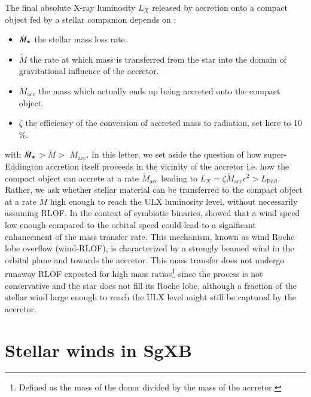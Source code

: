 \documentclass[letter]{aa}
\makeatletter
\newcommand{\ulx}{ULX\xspace}
\newcommand*{\rlof}{RLOF\@\xspace}
\newcommand*{\ie}{i.e.\@\xspace}
\newcommand{\mystar}{{\fontfamily{lmr}\selectfont$\star$}}
\newcommand*{\mdotstar}{$\dot{M}_{\text{\mystar}}$\@\xspace}
\newcommand*{\mdotacc}{$\dot{M}_{\text{acc}}$\@\xspace}
\newcommand*{\ledd}{$L_{\text{Edd}}$\@\xspace}
\makeatother
\begin{document}
The final absolute X-ray luminosity $L_X$ released by accretion onto a compact object fed by a stellar companion depends on :
\begin{itemize}
\item \mdotstar the stellar mass loss rate.
\item $\dot{M}$ the rate at which mass is transferred from the star into the domain of gravitational influence of the accretor.
\item \mdotacc the mass which actually ends up being accreted onto the compact object.
\item $\zeta$ the efficiency of the conversion of accreted mass to radiation, set here to 10$\%$.
\end{itemize} 
with \mdotstar $>\dot{M}>$ \mdotacc. In this letter, we set aside the question of how super-Eddington accretion itself proceeds in the vicinity of the accretor \ie how the compact object can accrete at a rate \mdotacc leading to $L_X=\zeta$\mdotacc$c^2>$\ledd. Rather, we ask whether stellar material can be transferred to the compact object at a rate $\dot{M}$ high enough to reach the ULX luminosity level, without necessarily assuming \rlof. In the context of symbiotic binaries, \cite{Mohamed2007} showed that a wind speed low enough compared to the orbital speed could lead to a significant enhancement of the mass transfer rate. This mechanism, known as wind Roche lobe overflow (wind-\rlof), is characterized by a strongly beamed wind in the orbital plane and towards the accretor. This mass transfer does not undergo runaway \rlof expected for high mass ratios\footnote{Defined as the mass of the donor divided by the mass of the accretor.} since the process is not conservative and the star does not fill its Roche lobe, although a fraction of the stellar wind large enough to reach the \ulx level might still be captured by the accretor.  

\section{Stellar winds in SgXB}
\label{sec:}
\end{document}
